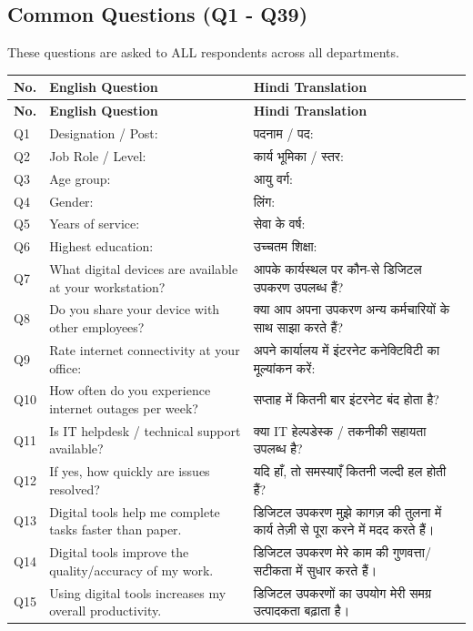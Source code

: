 \documentclass[11pt,a4paper]{article}
\begin{document}
\subsection{Common Questions (Q1 - Q39)}
These questions are asked to ALL respondents across all departments.

\begin{longtable}{|p{1cm}|p{6cm}|p{6cm}|}
\hline
\textbf{No.} & \textbf{English Question} & \textbf{Hindi Translation} \\ \hline
\endfirsthead
\hline
\textbf{No.} & \textbf{English Question} & \textbf{Hindi Translation} \\ \hline
\endhead
\hline
\endfoot
\hline
\endlastfoot
Q1 & Designation / Post: & पदनाम / पद: \\ \hline
Q2 & Job Role / Level: & कार्य भूमिका / स्तर: \\ \hline
Q3 & Age group: & आयु वर्ग: \\ \hline
Q4 & Gender: & लिंग: \\ \hline
Q5 & Years of service: & सेवा के वर्ष: \\ \hline
Q6 & Highest education: & उच्चतम शिक्षा: \\ \hline
Q7 & What digital devices are available at your workstation? & आपके कार्यस्थल पर कौन-से डिजिटल उपकरण उपलब्ध हैं? \\ \hline
Q8 & Do you share your device with other employees? & क्या आप अपना उपकरण अन्य कर्मचारियों के साथ साझा करते हैं? \\ \hline
Q9 & Rate internet connectivity at your office: & अपने कार्यालय में इंटरनेट कनेक्टिविटी का मूल्यांकन करें: \\ \hline
Q10 & How often do you experience internet outages per week? & सप्ताह में कितनी बार इंटरनेट बंद होता है? \\ \hline
Q11 & Is IT helpdesk / technical support available? & क्या IT हेल्पडेस्क / तकनीकी सहायता उपलब्ध है? \\ \hline
Q12 & If yes, how quickly are issues resolved? & यदि हाँ, तो समस्याएँ कितनी जल्दी हल होती हैं? \\ \hline
Q13 & Digital tools help me complete tasks faster than paper. & डिजिटल उपकरण मुझे कागज़ की तुलना में कार्य तेज़ी से पूरा करने में मदद करते हैं। \\ \hline
Q14 & Digital tools improve the quality/accuracy of my work. & डिजिटल उपकरण मेरे काम की गुणवत्ता/सटीकता में सुधार करते हैं। \\ \hline
Q15 & Using digital tools increases my overall productivity. & डिजिटल उपकरणों का उपयोग मेरी समग्र उत्पादकता बढ़ाता है। \\ \hline

\end{longtable}
\end{document}
